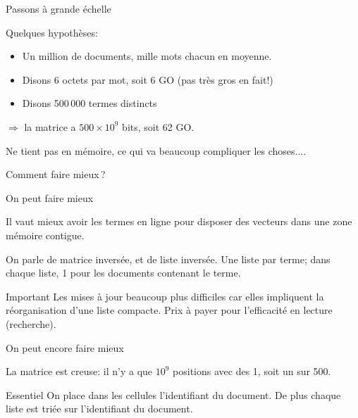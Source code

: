 \begin{frame}{Passons à grande échelle}

Quelques hypothèses:
\begin{itemize}
 \item Un million de documents, mille mots chacun en moyenne.
 \item Disons 6 octets par mot, soit 6 GO (pas très gros en fait!)
 \item Disons 500\,000 termes \alert{distincts}
\end{itemize}

$\Rightarrow$ la matrice a $500 \times 10^9$ bits, soit 62 GO.

\vfill

Ne tient pas en mémoire, ce qui va beaucoup compliquer les choses....

\vfill

\alert{Comment faire mieux\,?}

\end{frame}

\begin{frame}{On peut faire mieux}

  \begin{minipage}[c]{.46\linewidth}
       Il vaut mieux avoir les termes en ligne pour disposer des vecteurs dans une zone
mémoire contigue.

\vspace*{1cm}

On parle de matrice inversée, et de \alert{liste inversée}.
Une liste par terme; dans chaque liste, 1 pour les documents contenant le terme.
   \end{minipage} \hfill
   \begin{minipage}[c]{.46\linewidth}
   \end{minipage}
   

\begin{block}{Important}
Les mises à jour beaucoup plus difficiles car elles impliquent la réorganisation
d'une liste compacte. Prix à payer pour l'efficacité en \alert{lecture} (recherche).
\end{block}
\end{frame}


\begin{frame}{On peut encore faire mieux}

La matrice est \alert{creuse}: il n'y a que $10^9$ positions avec des 1, soit un sur 500.

\medskip



\medskip

\begin{block}{Essentiel}
On place dans les cellules \alert{l'identifiant} du document. De plus chaque liste est
\alert{triée} sur l'identifiant du document.
\end{block}

\end{frame}



